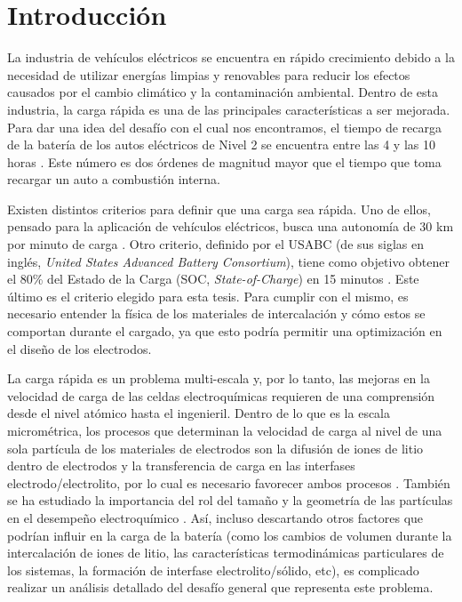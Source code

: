 \section{Introducción}

La industria de vehículos eléctricos se encuentra en rápido crecimiento debido a la
necesidad de utilizar energías limpias y renovables para reducir los efectos 
causados por el cambio climático y la contaminación ambiental. Dentro de esta 
industria, la carga rápida es una de las principales características a ser 
mejorada. Para dar una idea del desafío con el cual nos encontramos, el tiempo 
de recarga de la batería de los autos eléctricos de Nivel 2 se encuentra entre 
las 4 y las 10 horas \cite{evcs}. Este número es dos órdenes de magnitud 
mayor que el tiempo que toma recargar un auto a combustión interna.

Existen distintos criterios para definir que una carga sea rápida. Uno de ellos, 
pensado para la aplicación de vehículos eléctricos, busca una autonomía de 30 km 
por minuto de carga \cite{dufek2022}. Otro criterio, definido por el USABC (de sus
siglas en inglés, \textit{United States Advanced Battery Consortium}), tiene como
objetivo obtener el 80\% del Estado de la Carga (SOC, \textit{State-of-Charge})
en 15 minutos \cite{USABC}. Este último es el criterio elegido para esta tesis.
Para cumplir con el mismo, es necesario entender la física de los materiales de
intercalación y cómo estos se comportan durante el cargado, ya que esto podría 
permitir una optimización en el diseño de los electrodos.

La carga rápida es un problema multi-escala \cite{franco2013, franco2019} y, por 
lo tanto, las mejoras en la velocidad de carga de las celdas electroquímicas 
requieren de una comprensión desde el nivel atómico hasta el ingenieril. Dentro 
de lo que es la escala micrométrica, los procesos que determinan la velocidad de 
carga al nivel de una sola partícula de los materiales de electrodos son la 
difusión de iones de litio dentro de electrodos y la transferencia de carga en 
las interfases electrodo/electrolito, por lo cual es necesario favorecer ambos
procesos \cite{liu2019, tomaszewska2019, weiss2021}. También se ha estudiado la 
importancia del rol del tamaño y la geometría de las partículas en el desempeño 
electroquímico \cite{gavilan2020, gavilan2022}. Así, incluso descartando
otros factores que podrían influir en la carga de la batería (como los cambios de 
volumen durante la intercalación de iones de litio, las características termodinámicas particulares
de los sistemas, la formación de interfase electrolito/sólido, etc), es complicado
realizar un análisis detallado del desafío general que representa este problema.

